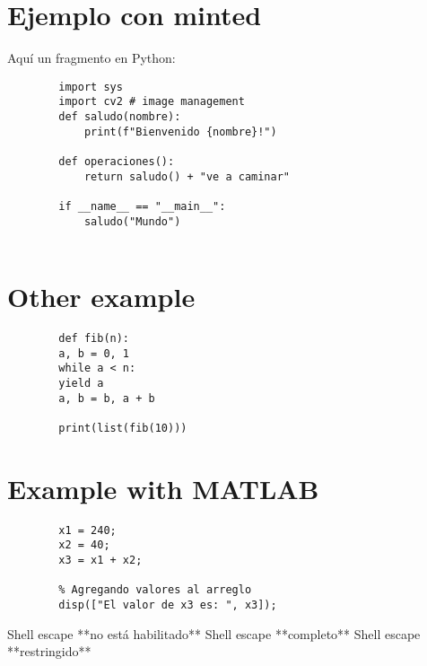 \documentclass[11pt]{article}
\begin{document}
	
	\section*{Ejemplo con minted}
	
	Aquí un fragmento en Python:
	
	\begin{verbatim}
		import sys
		import cv2 # image management
		def saludo(nombre):
			print(f"Bienvenido {nombre}!")
		
		def operaciones():
			return saludo() + "ve a caminar"
			
		if __name__ == "__main__":
			saludo("Mundo")
		
	\end{verbatim}
	
	\section*{Other example}
	\begin{verbatim}
		def fib(n):
		a, b = 0, 1
		while a < n:
		yield a
		a, b = b, a + b
		
		print(list(fib(10)))
	\end{verbatim}
	
	\section*{Example with MATLAB}
	\begin{verbatim}
		x1 = 240;
		x2 = 40;
		x3 = x1 + x2;
		
		% Agregando valores al arreglo
		disp(["El valor de x3 es: ", x3]);
	\end{verbatim}
	
	\ifcase\ShellEscapeStatus
	Shell escape **no está habilitado**\or
	Shell escape **completo**\or
	Shell escape **restringido**
	\fi
\end{document}
